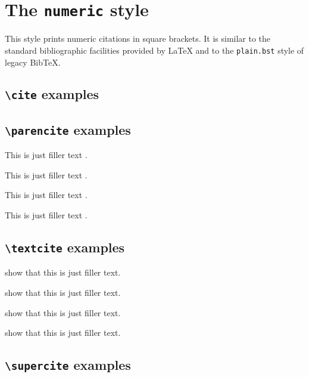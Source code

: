 \documentclass[a4paper]{article}
\newcommand{\cmd}[1]{\texttt{\textbackslash #1}}
\begin{document}
\section*{The \texttt{numeric} style}

This style prints numeric citations in square brackets. It is
similar to the standard bibliographic facilities provided by LaTeX
and to the \texttt{plain.bst} style of legacy BibTeX.

\subsection*{\cmd{cite} examples}

\cite{companion}

\cite[59]{companion}

\cite[see][]{companion}

\cite[see][59--63]{companion}

\subsection*{\cmd{parencite} examples}


This is just filler text \parencite{companion}.

This is just filler text \parencite[59]{companion}.

This is just filler text \parencite[see][]{companion}.

This is just filler text \parencite[see][59--63]{companion}.

\subsection*{\cmd{textcite} examples}


\textcite{companion} show that this is just filler text.

\textcite[59]{companion} show that this is just filler text.

\textcite[see][]{companion} show that this is just filler text.

\textcite[see][59--63]{companion} show that this is just filler text.

\subsection*{\cmd{supercite} examples}
\end{document}

